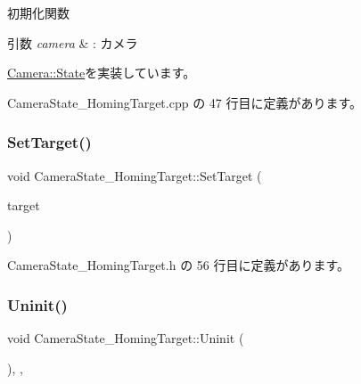 初期化関数 


\begin{DoxyParams}{引数}
{\em camera} & \+: カメラ \\
\hline
\end{DoxyParams}


\mbox{\hyperlink{class_camera_1_1_state_aa1b81471ab15e64b3117ffe7de9560ff}{Camera\+::\+State}}を実装しています。



 Camera\+State\+\_\+\+Homing\+Target.\+cpp の 47 行目に定義があります。

\mbox{\label{class_camera_state___homing_target_a5beacf25aaff9547b5c4e32cec698e28}} 
\subsubsection{\texorpdfstring{Set\+Target()}{SetTarget()}}
{\footnotesize\ttfamily void Camera\+State\+\_\+\+Homing\+Target\+::\+Set\+Target (\begin{DoxyParamCaption}\item[{\mbox{\hyperlink{class_game_object_base}{Game\+Object\+Base}} $\ast$}]{target }\end{DoxyParamCaption})\hspace{0.3cm}{\ttfamily [inline]}}



 Camera\+State\+\_\+\+Homing\+Target.\+h の 56 行目に定義があります。

\mbox{\label{class_camera_state___homing_target_ab2b5379b35ebafc53189bf4d45646c8c}} 
\subsubsection{\texorpdfstring{Uninit()}{Uninit()}}
{\footnotesize\ttfamily void Camera\+State\+\_\+\+Homing\+Target\+::\+Uninit (\begin{DoxyParamCaption}{ }\end{DoxyParamCaption})\hspace{0.3cm}{\ttfamily [inline]}, {\ttfamily [override]}, {\ttfamily [virtual]}}



